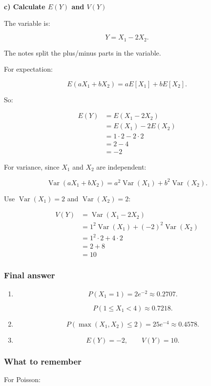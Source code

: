 \documentclass[10pt]{article}
\begin{document}
\textbf{c) Calculate $E(Y)$ and $V(Y)$}

The variable is:

\[
Y=X_1-2X_2.
\]

The notes split the plus/minus parts in the variable.

For expectation:

\[
E(aX_1+bX_2)
=
aE[X_1]+bE[X_2].
\]

So:

\begin{align*}
E(Y)
&=
E(X_1-2X_2) \\[2mm]
&=
E(X_1)-2E(X_2) \\[2mm]
&=
1\cdot 2-2\cdot 2 \\[2mm]
&=
2-4 \\[2mm]
&=-2
\end{align*}

For variance, since $X_1$ and $X_2$ are independent:

\[
\operatorname{Var}(aX_1+bX_2)
=
a^2\operatorname{Var}(X_1)
+b^2\operatorname{Var}(X_2).
\]

Use $\operatorname{Var}(X_1)=2$ and
$\operatorname{Var}(X_2)=2$:

\begin{align*}
V(Y)
&=
\operatorname{Var}(X_1-2X_2) \\[2mm]
&=
1^2\operatorname{Var}(X_1)
+(-2)^2\operatorname{Var}(X_2) \\[2mm]
&=
1^2\cdot 2+4\cdot 2 \\[2mm]
&=
2+8 \\[2mm]
&=10
\end{align*}

\subsubsection*{Final answer}
\begin{enumerate}[label=\alph*)]
\item
\[
P(X_1=1)=2e^{-2}\approx 0.2707.
\]

\[
P(1\leq X_1<4)\approx 0.7218.
\]

\item
\[
P(\max(X_1,X_2)\leq 2)
=25e^{-4}\approx 0.4578.
\]

\item
\[
E(Y)=-2,
\qquad
V(Y)=10.
\]
\end{enumerate}

\subsubsection*{What to remember}
For Poisson:
\end{document}
